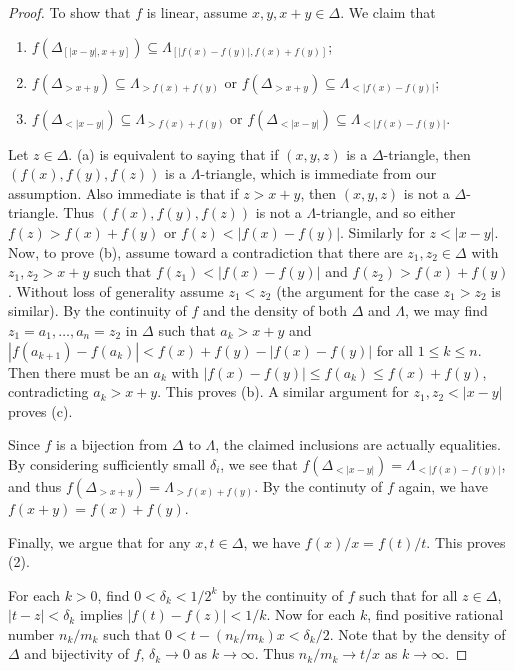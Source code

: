 \documentclass{amsart}
\theoremstyle{definition}
\theoremstyle{remark}
\begin{document}
\begin{proof}
To show that $f$ is linear, assume $x,y,x+y\in \Delta$. We claim that
\begin{enumerate}
\item[(a)] $f(\Delta_{[|x-y|, x+y]}) \subseteq \Lambda_{[|f(x)-f(y)|, f(x)+f(y)]}$; 
\item[(b)] $f(\Delta_{>x+y}) \subseteq \Lambda_{>f(x)+f(y)}  \mbox{ or } f(\Delta_{>x+y})\subseteq \Lambda_{<|f(x)-f(y)|}$;
\item[(c)] $f(\Delta_{<|x-y|}) \subseteq \Lambda_{>f(x)+f(y)} \mbox{ or } f(\Delta_{<|x-y|})\subseteq \Lambda_{<|f(x)-f(y)|}$. 
\end{enumerate}
Let $z\in \Delta$. (a) is equivalent to saying that if $(x,y,z)$ is a $\Delta$-triangle, then $(f(x), f(y), f(z))$ is a $\Lambda$-triangle, which is immediate from our assumption. Also immediate is that if $z > x+y$, then $(x,y,z)$ is not a $\Delta$-triangle. Thus $(f(x),f(y),f(z))$ is not a $\Lambda$-triangle, and so either $f(z) > f(x)+f(y)$ or $f(z) < |f(x)-f(y)|$. Similarly for $z <|x-y|$. Now, to prove (b), assume toward a contradiction that there are $z_1, z_2\in \Delta$ with $z_1, z_2 >x+y$ such that $f(z_1)<|f(x)-f(y)|$ and $f(z_2)>f(x)+f(y)$. Without loss of generality assume $z_1<z_2$ (the argument for the case $z_1>z_2$ is similar). By the continuity of $f$ and the density of both $\Delta$ and $\Lambda$, we may find $z_1=a_1,\dots, a_n=z_2$ in $\Delta$ such that $a_k>x+y$ and $|f(a_{k+1})-f(a_k)| < f(x)+f(y)-|f(x)-f(y)|$ for all $1\leq k\leq n$. Then there must be an $a_k$ with $|f(x)-f(y)| \leq f(a_k) \leq f(x)+f(y)$, contradicting $a_k>x+y$. This proves (b). A similar argument for $z_1, z_2 < |x-y|$ proves (c). 

        Since $f$ is a bijection from $\Delta$ to $\Lambda$, the claimed inclusions are actually equalities. By considering sufficiently small $\delta_i$, we see that $f(\Delta_{<|x-y|}) = \Lambda_{<|f(x)-f(y)|}$, and thus $f(\Delta_{>x+y}) = \Lambda_{>f(x)+f(y)}$. By the continuty of $f$ again, we have $f(x+y) =f(x)+f(y)$.   
   
Finally, we argue that for any $x,t \in \Delta$, we have $f(x)/x=f(t)/t$. This proves (2). 


    For each $k > 0 $, find $0< \delta_k < 1/2^k$ by the continuity of $f$ such that for all $z\in \Delta$, $|t-z|<\delta_k$ implies $|f(t)-f(z)| < 1/k$. Now for each $k$, find positive rational number $n_k/m_k$ such that $0< t-(n_k/m_k)x < \delta_k/2$. Note that by the density of $\Delta$ and bijectivity of $f$, $\delta_k \to 0$ as $k \to \infty$. Thus $n_k/m_k \to t/x$ as $k \to \infty$. 


\end{proof}
\end{document}
